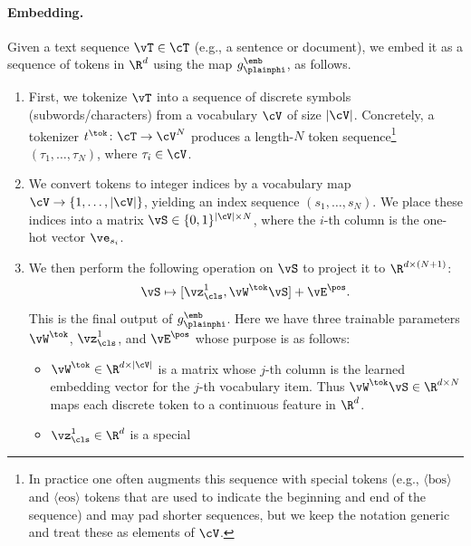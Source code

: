 \documentclass[../../book-main.tex]{subfiles}
\begin{document}
\paragraph{Embedding.} Given a text sequence \(\vT \in \cT\) (e.g., a
sentence or document), we embed it as a sequence of tokens in
\(\R^{d}\) using the map \(g_{\plainphi}^{\emb}\), as follows.
\begin{enumerate}
    \item First, we tokenize \(\vT\) into a sequence of discrete
        symbols (subwords/characters) from a vocabulary \(\cV\) of
        size \(|\cV|\).
        Concretely, a tokenizer
        \(t^{\tok} \colon \cT \to \cV^{N}\) produces a length-\(N\) token
        sequence\footnote{In practice one often augments this
        sequence with special tokens (e.g., \(\langle \mathrm{bos} \rangle\) and
        \(\langle \mathrm{eos} \rangle\)
        tokens that are used to indicate the beginning and end of the sequence) and may pad shorter sequences, but we keep the notation
        generic and treat these as elements of 
        \(\cV\).} \((\tau_{1}, \dots, \tau_{N})\), where
        \(\tau_{i} \in \cV\).
    \item We convert tokens to integer indices by a vocabulary map
        \(\cV \to \{1, \dots, |\cV|\}\), yielding an index
        sequence \((s_{1}, \dots, s_{N})\).
        We place these indices into
        a matrix \(\vS \in \{0, 1\}^{|\cV| \times N}\), where the
        \(i\)-th column is the one-hot vector \(\ve_{s_{i}}\).
    \item We then perform the following operation on \(\vS\) to project it to \(\R^{d \times (N+1)}\):
        \begin{equation}
            \vS \mapsto [\vz_{\cls}^{1}, \vW^{\tok}\vS] + \vE^{\pos} .
        \end{equation}
        This is the final output of \(g_{\plainphi}^{\emb}\).
        Here we have three trainable parameters \(\vW^{\tok}\),
        \(\vz_{\cls}^{1}\), and \(\vE^{\pos}\) whose purpose is as follows:
        \begin{itemize}
            \item \(\vW^{\tok} \in \R^{d \times |\cV|}\) is a matrix
                whose \(j\)-th column is the learned embedding vector
                for the \(j\)-th vocabulary item.
                Thus \(\vW^{\tok}\vS
                \in \R^{d \times N}\) maps each discrete token to a
                continuous feature in \(\R^{d}\).
            \item \(\vz_{\cls}^{1} \in \R^{d}\) is a special

\end{itemize}
\end{enumerate}
\end{document}
